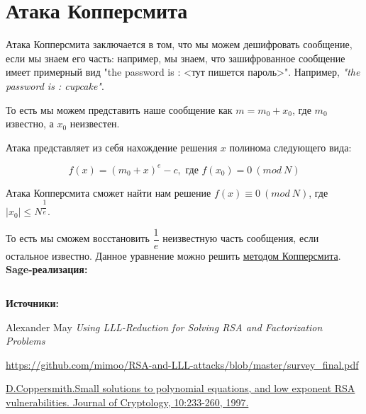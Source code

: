 \documentclass[12pt,a4paper]{scrartcl}
\begin{document}
\section{Атака Копперсмита}

Атака Копперсмита заключается в том, что мы можем дешифровать сообщение, если мы знаем его часть: например, мы знаем, что зашифрованное сообщение имеет примерный вид "the password is : <тут пишется пароль>". Например, \textit{"the password is : cupcake"}.

То есть мы можем представить наше сообщение как $m=m_0+x_0$, где $m_0$ известно, а $x_0$ неизвестен.

Атака представляет из себя нахождение решения $x$ полинома следующего вида:

$$f(x)=(m_0+x)^e-c,\text{ где } f(x_0)=0\ (mod\ N) $$

Атака Копперсмита сможет найти нам решение $f(x) \equiv 0\ (mod\ N)$, где $|x_0| \leq N^{\dfrac{1}{e}}$.

То есть мы сможем восстановить $\dfrac{1}{e}$ неизвестную часть сообщения, если остальное известно. Данное уравнение можно решить \href{https://yatb.kksctf.ru/}{методом Копперсмита}.\\

\textbf{Sage-реализация:}

\inputminted[tabsize=4,obeytabs,fontsize=\footnotesize]{python3}{./RSA_scripts/koppersmith.sage}

\textbf{Источники:}

Alexander May \textit{Using LLL-Reduction for Solving RSA and Factorization Problems}

\href{https://github.com/mimoo/RSA-and-LLL-attacks/blob/master/survey_final.pdf}{https://github.com/mimoo/RSA-and-LLL-attacks/blob/master/survey\_final.pdf}

\href{https://www.di.ens.fr/~fouque/ens-rennes/coppersmith.pdf}{D.Coppersmith.Small solutions to polynomial equations, and low exponent RSA vulnerabilities. Journal of Cryptology, 10:233-260, 1997.}
\end{document}
